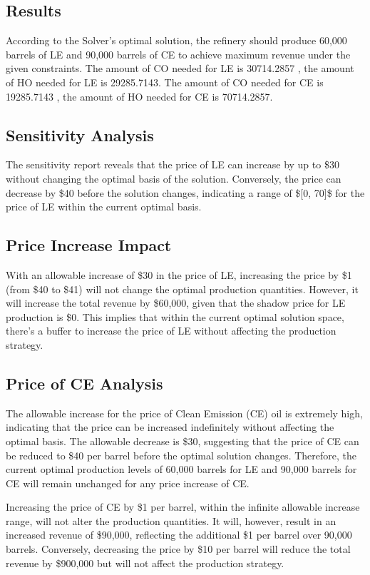 \documentclass[12pt]{article}
\begin{document}
\subsection*{Results}
According to the Solver's optimal solution, the refinery should produce 60,000 barrels of LE and 90,000 barrels of CE to achieve maximum revenue under the given constraints. The amount of CO needed for LE is 30714.2857 , the amount of HO needed for LE is 29285.7143. The amount of CO needed for CE is 19285.7143 , the amount of HO needed for CE is 70714.2857. 

\subsection*{Sensitivity Analysis}
The sensitivity report reveals that the price of LE can increase by up to \$30 without changing the optimal basis of the solution. Conversely, the price can decrease by \$40 before the solution changes, indicating a range of \$[0, 70]\$ for the price of LE within the current optimal basis.

\subsection*{Price Increase Impact}
With an allowable increase of \$30 in the price of LE, increasing the price by \$1 (from \$40 to \$41) will not change the optimal production quantities. However, it will increase the total revenue by \$60,000, given that the shadow price for LE production is \$0. This implies that within the current optimal solution space, there's a buffer to increase the price of LE without affecting the production strategy.



\subsection*{Price of CE Analysis}

The allowable increase for the price of Clean Emission (CE) oil is extremely high, indicating that the price can be increased indefinitely without affecting the optimal basis. The allowable decrease is \$30, suggesting that the price of CE can be reduced to \$40 per barrel before the optimal solution changes. Therefore, the current optimal production levels of 60,000 barrels for LE and 90,000 barrels for CE will remain unchanged for any price increase of CE.

Increasing the price of CE by \$1 per barrel, within the infinite allowable increase range, will not alter the production quantities. It will, however, result in an increased revenue of \$90,000, reflecting the additional \$1 per barrel over 90,000 barrels. Conversely, decreasing the price by \$10 per barrel will reduce the total revenue by \$900,000 but will not affect the production strategy.
\end{document}
